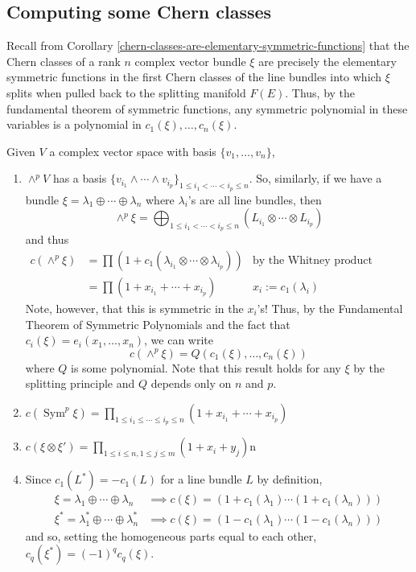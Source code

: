 \documentclass[11pt,leqno,oneside]{amsbook}
\numberwithin{thm}{section}
\begin{document}
\subsection{Computing some Chern classes}
Recall from Corollary \ref{chern-classes-are-elementary-symmetric-functions}
that the Chern classes of a rank \(n\) complex 
vector bundle \(\xi\) are precisely the elementary symmetric functions in the
first Chern classes of the line bundles into which \(\xi\) splits when
pulled back to the splitting manifold \(F(E)\). Thus, by the
fundamental theorem of symmetric functions, any symmetric polynomial
in these variables is a polynomial in \(c_1(\xi), \ldots, c_n(\xi)\).
\begin{example}
  Given \(V\) a complex vector space with basis \(\{v_1, \ldots, v_n\}\),
  \begin{enumerate}
  \item \(\wedge^p V\) has a basis \(\{v_{i_1} \wedge \cdots \wedge
    v_{i_p}\}_{1 \leq i_1 < \cdots < i_p \leq n}\). So, similarly, if
    we have a bundle \(\xi = \lambda_1 \oplus \cdots \oplus
    \lambda_n\) where \(\lambda_i\)'s are all line bundles, then \[
      \wedge^p \xi = \bigoplus_{1 \leq i_1 < \cdots < i_p \leq n}
      (L_{i_1} \otimes \cdots \otimes L_{i_p})
    \]
    and thus
    \begin{align*}
      c(\wedge^p \xi)
      & = \prod (1 + c_1(\lambda_{i_1} \otimes \cdots \otimes
        \lambda_{i_p}))
      & \text{by the Whitney product formula}\\
      & = \prod (1+x_{i_1} + \cdots + x_{i_p}) & x_i := c_1(\lambda_i)
    \end{align*}
    Note, however, that this is symmetric in the \(x_i\)'s! Thus, by
    the Fundamental Theorem of Symmetric Polynomials and the fact that
    \(c_i(\xi) = e_i(x_1,\ldots,x_n)\), we can write \[
      c\left( \wedge^p \xi \right) = Q(c_1(\xi), \ldots, c_n(\xi))
    \]
    where \(Q\) is some polynomial. Note that this result holds for
    any \(\xi\) by the splitting principle and \(Q\) depends only on
    \(n\) and \(p\).
  \item \(c\left( \operatorname{Sym}^p \xi \right) = \prod_{1 \leq i_1
      \leq \cdots \leq i_p \leq n} (1+x_{i_1} + \cdots + x_{i_p})\)
  \item \(c(\xi \otimes \xi') = \prod_{1 \leq i \leq n, 1 \leq j \leq
      m} (1+x_i+y_j)\)n
  \item Since \(c_1(L^*) = -c_1(L)\) for a line bundle \(L\) by
    definition,
    \begin{align*}
      \xi = \lambda_1 \oplus \cdots \oplus \lambda_n
      & \implies c(\xi) = (1+c_1(\lambda_1) \cdots (1+c_1(\lambda_n)))
      \\
      \xi^* = \lambda_1^* \oplus \cdots \oplus \lambda_n^*
      & \implies c(\xi) = (1-c_1(\lambda_1) \cdots (1-c_1(\lambda_n)))
    \end{align*}
    and so, setting the homogeneous parts equal to each other,
    \(c_q(\xi^*) = (-1)^q c_q(\xi)\).
  \end{enumerate}
\end{example}
\end{document}
